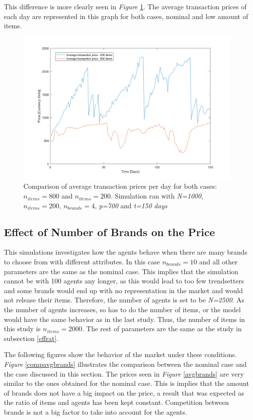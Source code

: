 \documentclass[12pt]{article}
\begin{document}
This difference is more clearly seen in \textit{Figure} \ref{translow}. The average transaction prices of each day are represented in this graph for both cases, nominal and low amount of items.

\begin{figure}
    \centering
    \includegraphics[width=0.6\columnwidth]{Low_Items/Avrg-transp_lowitems.png}
    \caption{Comparison of average transaction prices per day for both cases: \textit{$n_{items}=800$} and \textit{$n_{items}=200$}. Simulation ran with \textit{N=1000}, \textit{$n_{items}=200$}, \textit{$n_{brands}=4$}, \textit{p=700} and \textit{t=150 days}}
    \label{translow}
\end{figure}

\subsection{Effect of Number of Brands on the Price}

This simulations investigates how the agents behave when there are many brands to choose from with different attributes. In this case \textit{$n_{brands}=10$} and all other parameters are the same  as the nominal case. This implies that the simulation cannot be with 100 agents any longer, as this would lead to too few trendsetters and some brands would end up with no representation in the market and would not release their items. Therefore, the number of agents is set to be \textit{N=2500}. As the number of agents increases, so has to do the number of items, or the model would have the same behavior as in the last study. Thus, the number of items in this study is \textit{$n_{items}=2000$}. The rest of parameters are the same as the study in subsection \ref{effrat}. 

The following figures show the behavior of the market under these conditions. \textit{Figure} \ref{compavgbrands} illustrates the comparison between the nominal case and the case discussed in this section. The prices seen in \textit{Figure} \ref{avgbrands} are very similar to the ones obtained for the nominal case. This is implies that the amount of brands does not have a big impact on the price, a result that was expected as the ratio of items and agents has been kept constant. Competition between brands is not a big factor to take into account for the agents. 
\end{document}
